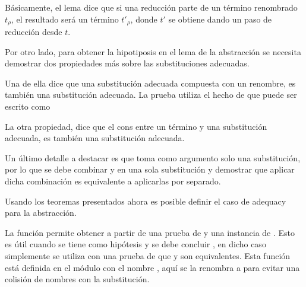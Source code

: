 Básicamente, el lema dice que si una reducción parte de un término renombrado $t_\rho$, el resultado será un término $t'_\rho$, donde $t'$ se obtiene dando un paso de reducción desde $t$.
\fi

Por otro lado, para obtener la hipotiposis  en el lema de la abstracción se necesita demostrar dos propiedades más sobre las substituciones adecuadas.

Una de ella dice que una substitución adecuada compuesta con un renombre, es también una substitución adecuada.
La prueba utiliza el hecho de que   puede ser escrito como
\subst{\comp{\ids}{\bound{$\rho$}}}{}


La otra propiedad, dice que el cons entre un término \snstar y una substitución adecuada, es también una substitución adecuada.


Un último detalle a destacar es que  toma como argumento solo una substitución, por lo que se debe combinar \bound{$\sigma$} y
en una sola substitución y demostrar que aplicar dicha combinación es equivalente a aplicarlas por separado.



Usando los teoremas presentados ahora es posible definir el caso de adequacy para la abstracción.

\begin{samepage}
\end{samepage}

La función  permite obtener  a partir de una prueba de  \type{$\cong$}  y una instancia de .
Esto es útil cuando se tiene como hipótesis \snstar {} y se debe concluir \snstar {}, en dicho caso simplemente se utiliza  con una prueba de que  y  son equivalentes.
Esta función está definida en el módulo  con el nombre , aquí se la renombra a  para evitar una colisión de nombres con la substitución.

